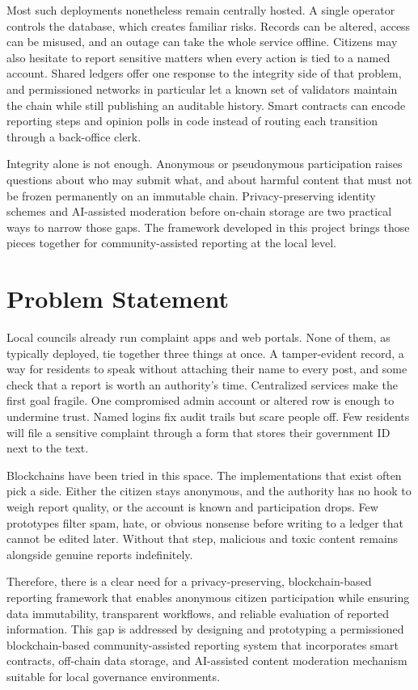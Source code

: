 Most such deployments nonetheless remain centrally hosted. A single operator controls the database, which creates familiar risks. Records can be altered, access can be misused, and an outage can take the whole service offline. Citizens may also hesitate to report sensitive matters when every action is tied to a named account. Shared ledgers offer one response to the integrity side of that problem, and permissioned networks in particular let a known set of validators maintain the chain while still publishing an auditable history. Smart contracts can encode reporting steps and opinion polls in code instead of routing each transition through a back-office clerk.

Integrity alone is not enough. Anonymous or pseudonymous participation raises questions about who may submit what, and about harmful content that must not be frozen permanently on an immutable chain. Privacy-preserving identity schemes and \ac{AI}-assisted moderation before on-chain storage are two practical ways to narrow those gaps. The framework developed in this project brings those pieces together for community-assisted reporting at the local level.

\section{Problem Statement}

Local councils already run complaint apps and web portals. None of them, as typically deployed, tie together three things at once. A tamper-evident record, a way for residents to speak without attaching their name to every post, and some check that a report is worth an authority's time. Centralized services make the first goal fragile. One compromised admin account or altered row is enough to undermine trust. Named logins fix audit trails but scare people off. Few residents will file a sensitive complaint through a form that stores their government ID next to the text.

Blockchains have been tried in this space. The implementations that exist often pick a side. Either the citizen stays anonymous, and the authority has no hook to weigh report quality, or the account is known and participation drops. Few prototypes filter spam, hate, or obvious nonsense before writing to a ledger that cannot be edited later. Without that step, malicious and toxic content remains alongside genuine reports indefinitely.

Therefore, there is a clear need for a privacy-preserving, blockchain-based reporting framework that enables anonymous citizen participation while ensuring data immutability, transparent workflows, and reliable evaluation of reported information. This gap is addressed by designing and prototyping a permissioned blockchain-based community-assisted reporting system that incorporates smart contracts, off-chain data storage, and \ac{AI}-assisted content moderation mechanism suitable for local governance environments.

